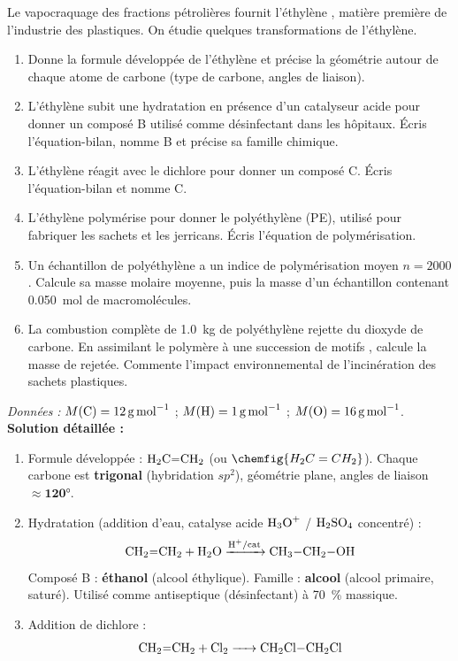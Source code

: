 \documentclass[11pt]{article}
\begin{document}
\begin{exoresolu}
Le vapocraquage des fractions pétrolières fournit l'éthylène , matière première de l'industrie des plastiques. On étudie quelques transformations de l'éthylène.
\begin{enumerate}
\item Donne la formule développée de l'éthylène et précise la géométrie autour de chaque atome de carbone (type de carbone, angles de liaison).
\item L'éthylène subit une hydratation en présence d'un catalyseur acide pour donner un composé B utilisé comme désinfectant dans les hôpitaux. Écris l'équation-bilan, nomme B et précise sa famille chimique.
\item L'éthylène réagit avec le dichlore pour donner un composé C. Écris l'équation-bilan et nomme C.
\item L'éthylène polymérise pour donner le polyéthylène (PE), utilisé pour fabriquer les sachets et les jerricans. Écris l'équation de polymérisation.
\item Un échantillon de polyéthylène a un indice de polymérisation moyen $n = 2000$. Calcule sa masse molaire moyenne, puis la masse d'un échantillon contenant \SI{0,050}{mol} de macromolécules.
\item La combustion complète de \SI{1,0}{kg} de polyéthylène rejette du dioxyde de carbone. En assimilant le polymère à une succession de motifs , calcule la masse de  rejetée. Commente l'impact environnemental de l'incinération des sachets plastiques.
\end{enumerate}
\emph{Données :} $M(\ce{C}) = \SI{12}{g.mol^{-1}}$ ; $M(\ce{H}) = \SI{1}{g.mol^{-1}}$ ; $M(\ce{O}) = \SI{16}{g.mol^{-1}}$.
\tcblower
\textbf{Solution détaillée :}
\begin{enumerate}
\item Formule développée : $\ce{H2C=CH2}$ (ou $\chemfig{H_2C=CH_2}$).
  Chaque carbone est \textbf{trigonal} (hybridation $sp^2$), géométrie plane, angles de liaison $\approx \mathbf{\ang{120}}$.
\item Hydratation (addition d'eau, catalyse acide $\ce{H3O+}$ / $\ce{H2SO4}$ concentré) :
  \[ \ce{CH2=CH2 + H2O ->[H+/cat] CH3-CH2-OH} \]
  Composé B : \textbf{éthanol} (alcool éthylique). Famille : \textbf{alcool} (alcool primaire, saturé). Utilisé comme antiseptique (désinfectant) à \SI{70}{\%} massique.
\item Addition de dichlore :
  \[ \ce{CH2=CH2 + Cl2 -> CH2Cl-CH2Cl} \]

\end{enumerate}
\end{exoresolu}
\end{document}
